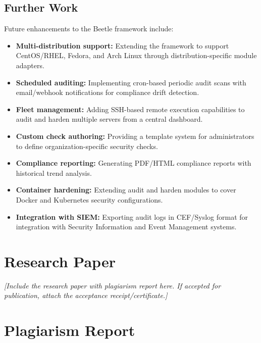 \subsection{Further Work}

Future enhancements to the Beetle framework include:

\begin{itemize}[noitemsep]
    \item \textbf{Multi-distribution support:} Extending the framework to support CentOS/RHEL, Fedora, and Arch Linux through distribution-specific module adapters.
    \item \textbf{Scheduled auditing:} Implementing cron-based periodic audit scans with email/webhook notifications for compliance drift detection.
    \item \textbf{Fleet management:} Adding SSH-based remote execution capabilities to audit and harden multiple servers from a central dashboard.
    \item \textbf{Custom check authoring:} Providing a template system for administrators to define organization-specific security checks.
    \item \textbf{Compliance reporting:} Generating PDF/HTML compliance reports with historical trend analysis.
    \item \textbf{Container hardening:} Extending audit and harden modules to cover Docker and Kubernetes security configurations.
    \item \textbf{Integration with SIEM:} Exporting audit logs in CEF/Syslog format for integration with Security Information and Event Management systems.
\end{itemize}

\pagebreak
\section{Research Paper}

\textit{[Include the research paper with plagiarism report here. If accepted for publication, attach the acceptance receipt/certificate.]}

\pagebreak
\section{Plagiarism Report}

